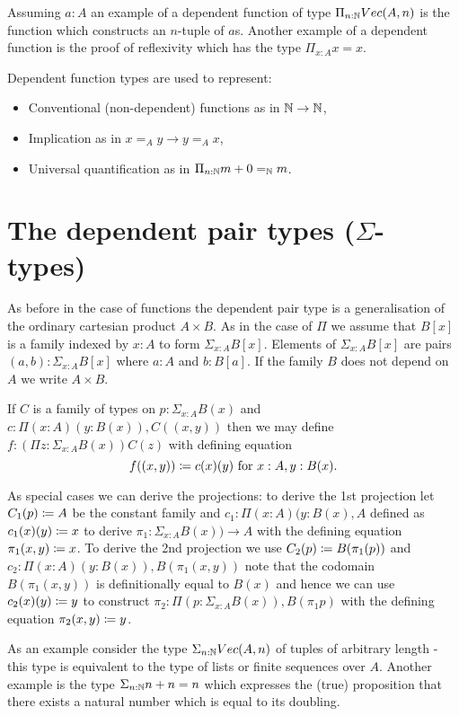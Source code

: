 Assuming $a:A$ an example of a dependent function of type $\Pi_{n:\mathbb{N}}Vec(A,n)$
is the function which constructs an $n$-tuple of $a$s. Another example
of a dependent function is the proof of reflexivity which has the type
$\Pi_{x:A}x = x$.

Dependent function types are used to represent:
\begin{itemize}
\item Conventional (non-dependent) functions as in $\mathbb{N} \to \mathbb{N}$,
\item Implication as in $x =_A y \to y =_A x$,
\item Universal quantification as in $\Pi_{n:\mathbb{N}}m+0 =_\mathbb{N} m$.
\end{itemize}

\section{The dependent pair types ($\Sigma$-types)}
\label{sec:sigma-types}

As before in the case of functions the dependent pair type is a
generalisation of the ordinary cartesian product $A \times B$. 
As in the case of $\Pi$ we assume that $B[x]$ is a family indexed by
$x:A$ to form $\Sigma_{x:A}B[x]$. Elements of $\Sigma_{x:A}B[x]$ are
pairs $(a,b) : \Sigma_{x:A}B[x]$ where $a:A$ and $b:B[a]$. If the
family $B$ does not depend on $A$ we write $A \times B$.

If $C$ is a family of types on $p:\Sigma_{x:A}B(x)$ and 
$c:\Pi(x:A)(y:B(x)),C((x,y))$ then we may define 
$f:(\Pi z:\Sigma_{x:A}B(x))C(z)$ with defining equation
  \[f((x,y))\coloneqq c(x)(y)\mbox{ for } x:A,y:B(x).\]

As special cases we can derive the projections: to derive the 1st
projection let $C_1(p) \coloneqq A$ be the constant family and $c_1 : \Pi (x:A)(y:B(x),A$
defined as $c_1(x)(y) \coloneqq x$ to derive $\pi_1 : \Sigma_{x:A}B(x)) \to A$
with the defining equation $\pi_1 (x,y) \coloneqq x$. To derive the 2nd
projection we use $C_2(p) \coloneqq B (\pi_1(p))$ and $c_2 : \Pi
(x:A)(y:B(x)),B(\pi_1(x,y))$ note that the codomain $B(\pi_1(x,y))$ is
definitionally equal to $B(x)$ and hence we can use $c_2(x)(y) \coloneqq
y$ to construct $\pi_2 : \Pi(p : \Sigma_{x:A}{B(x)}),B(\pi_1 p)$ with
the defining equation $\pi_2(x,y) \coloneqq y$.

As an example consider the type $\Sigma_{n:\mathbb{N}}Vec(A,n)$ of tuples of
arbitrary length - this type is equivalent to the type of lists or
finite sequences over $A$. Another example is the type
$\Sigma_{n:\mathbb{N}}n+n = n$ which expresses the (true) proposition that
there exists a natural number which is equal to its doubling.

